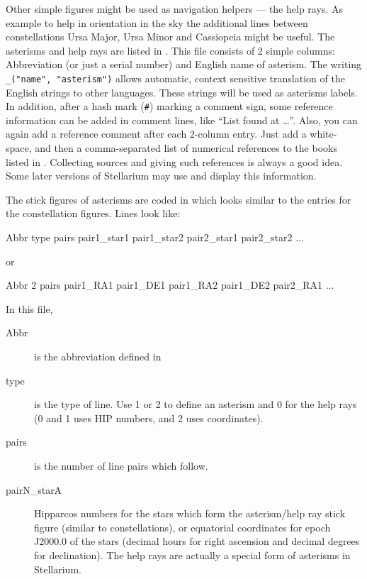 Other simple figures might be used as navigation helpers --- the help rays. 
As example to help in orientation in the sky the additional lines between constellations 
Ursa Major, Ursa Minor and Cassiopeia might be useful. The asterisms and help rays are listed in
. This file consists of 2 simple columns:
Abbreviation (or just a serial number) and English
name of asterism. The writing \texttt{\_("name", "asterism")} allows automatic, context sensitive
translation of the English strings to other languages. These strings
will be used as asterisms labels. In addition, after a hash mark (\texttt{\#}) marking a comment sign, 
some reference information can be added in comment lines, like ``List found at \ldots''.
Also, you can  again add a reference comment after each
2-column entry. Just add a white-space, and then a comma-separated list
of numerical references to the books listed in .
Collecting sources and giving such references 
is always a good idea. Some later versions of Stellarium may use and display this information.

The stick figures of asterisms are coded in 
which looks similar to the entries for the constellation
figures. Lines look like:

\begin{configfile}
Abbr type pairs pair1_star1 pair1_star2 pair2_star1 pair2_star2 ...
\end{configfile}
or
\begin{configfile}
Abbr 2 pairs pair1_RA1 pair1_DE1 pair1_RA2 pair1_DE2 pair2_RA1 ...
\end{configfile}
In this file,
\begin{description}
\item[Abbr] is the abbreviation defined in 
\item[type] is the type of line. Use 1 or 2 to define an asterism and 0 for the help rays (0 and 1 uses HIP numbers, and 2 uses coordinates).
\item[pairs] is the number of line pairs which follow.
\item[pairN\_starA] Hipparcos numbers for the stars which form the asterism/help ray stick figure (similar to constellations),
  or equatorial coordinates for epoch J2000.0 of the stars (decimal hours for right ascension and decimal degrees for declination).
  The help rays are actually a special form of asterisms in Stellarium. 
\end{description}

